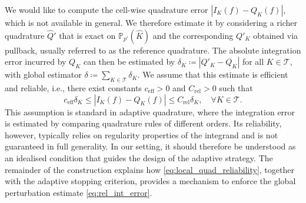 \documentclass[oneside,reqno,11pt,a4paper]{amsart}
\theoremstyle{definition}
\newcommand{\abs}[1]{\left\lvert#1\right\rvert}
\begin{document}
We would like to compute the cell-wise quadrature error
$\abs{I_K(f) - Q_K(f)}$, which is not available in general. We therefore
estimate it by considering a richer quadrature $\widehat Q'$ that is exact on
$\mathbb P_{p'}(\widehat K)$ and the corresponding $Q'_K$ obtained via
pullback, usually referred to as the reference quadrature. The
absolute integration error incurred by $Q_K$ can then be estimated by
$\delta_K \coloneqq \abs{Q'_K - Q_K}$ for all $K \in \mathcal{T}$, with global
estimator $\delta \coloneqq \sum_{K \in \mathcal{T}} \delta_K$. We assume that this estimate is efficient
and reliable, i.e., there exist constants  $c_{\mathrm{eff}} > 0$ and
$C_{\mathrm{rel}} > 0$ such that
\begin{equation}\label{eq:local_quad_reliability}
  c_{\mathrm{eff}} \delta_K \leq \abs{I_K(f) - Q_K(f)} \leq C_{\mathrm{rel}} \delta_K,
  \quad \forall K \in \mathcal{T}.
  \tag{A1$'$}
\end{equation}
This assumption is standard in adaptive quadrature, where the integration error
is estimated by comparing quadrature rules of different orders. Its
reliability, however, typically relies on regularity properties of the
integrand and is not guaranteed in full generality. In our setting, it should
therefore be understood as an idealised condition that guides the design of the
adaptive strategy. The remainder of the construction explains how
\eqref{eq:local_quad_reliability}, together with the adaptive stopping
criterion, provides a mechanism to enforce the global perturbation estimate
\eqref{eq:rel_int_error}.
\end{document}
